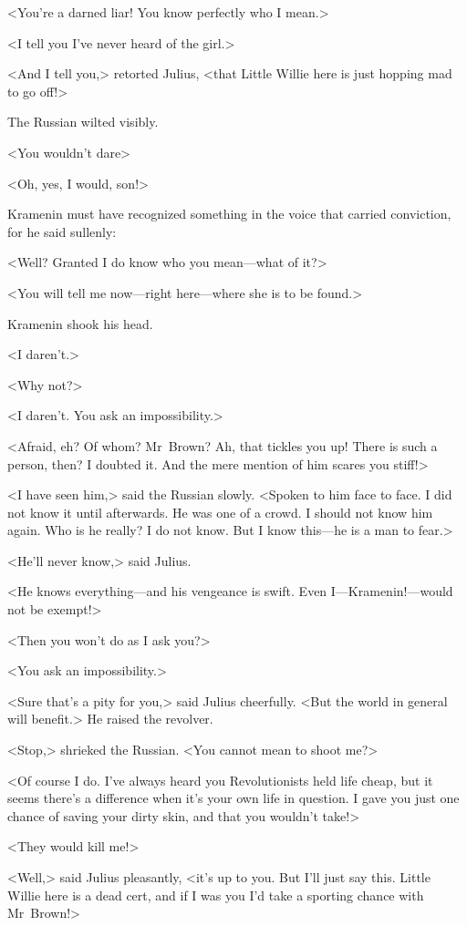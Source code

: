<You're a darned liar! You know perfectly who I mean.>

<I tell you I've never heard of the girl.>

<And I tell you,> retorted Julius, <that Little Willie here is just hopping mad to go off!>

The Russian wilted visibly.

<You wouldn't dare\longdash>

<Oh, yes, I would, son!>

Kramenin must have recognized something in the voice that carried conviction, for he said sullenly:

<Well? Granted I do know who you mean—what of it?>

<You will tell me now—right here—where she is to be found.>

Kramenin shook his head.

<I daren't.>

<Why not?>

<I daren't. You ask an impossibility.>

<Afraid, eh? Of whom? Mr~Brown? Ah, that tickles you up! There is such a person, then? I doubted it. And the mere mention of him scares you stiff!>

<I have seen him,> said the Russian slowly. <Spoken to him face to face. I did not know it until afterwards. He was one of a crowd. I should not know him again. Who is he really? I do not know. But I know this—he is a man to fear.>

<He'll never know,> said Julius.

<He knows everything—and his vengeance is swift. Even I—Kramenin!—would not be exempt!>

<Then you won't do as I ask you?>

<You ask an impossibility.>

<Sure that's a pity for you,> said Julius cheerfully. <But the world in general will benefit.> He raised the revolver.

<Stop,> shrieked the Russian. <You cannot mean to shoot me?>

<Of course I do. I've always heard you Revolutionists held life cheap, but it seems there's a difference when it's your own life in question. I gave you just one chance of saving your dirty skin, and that you wouldn't take!>

<They would kill me!>

<Well,> said Julius pleasantly, <it's up to you. But I'll just say this. Little Willie here is a dead cert, and if I was you I'd take a sporting chance with Mr~Brown!>


